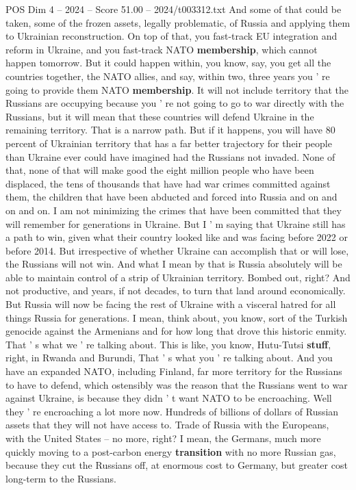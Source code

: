 \begin{textsample}{POS Dim 4 – 2024 – Score 51.00 – 2024/t003312.txt}
And some of that could be taken, some of the frozen assets, legally problematic, of Russia and applying them to Ukrainian reconstruction.
On top of that, you fast-track EU integration and reform in Ukraine, and you fast-track NATO \textbf{membership}, which cannot happen tomorrow.
But it could happen within, you know, say, you get all the countries together, the NATO allies, and say, within two, three years you ' re going to provide them NATO \textbf{membership}.
It will not include territory that the Russians are occupying because you ' re not going to go to war directly with the Russians, but it will mean that these countries will defend Ukraine in the remaining territory.
That is a narrow path.
But if it happens, you will have 80 percent of Ukrainian territory that has a far better trajectory for their people than Ukraine ever could have imagined had the Russians not invaded.
None of that, none of that will make good the eight million people who have been displaced, the tens of thousands that have had war crimes committed against them, the children that have been abducted and forced into Russia and on and on and on.
I am not minimizing the crimes that have been committed that they will remember for generations in Ukraine.
But I ' m saying that Ukraine still has a path to win, given what their country looked like and was facing before 2022 or before 2014.
But irrespective of whether Ukraine can accomplish that or will lose, the Russians will not win.
And what I mean by that is Russia absolutely will be able to maintain control of a strip of Ukrainian territory.
Bombed out, right?
And not productive, and years, if not decades, to turn that land around economically.
But Russia will now be facing the rest of Ukraine with a visceral hatred for all things Russia for generations.
I mean, think about, you know, sort of the Turkish genocide against the Armenians and for how long that drove this historic enmity.
That ' s what we ' re talking about.
This is like, you know, Hutu-Tutsi \textbf{stuff}, right, in Rwanda and Burundi, That ' s what you ' re talking about.
And you have an expanded NATO, including Finland, far more territory for the Russians to have to defend, which ostensibly was the reason that the Russians went to war against Ukraine, is because they didn ' t want NATO to be encroaching.
Well they ' re encroaching a lot more now.
Hundreds of billions of dollars of Russian assets that they will not have access to.
Trade of Russia with the Europeans, with the United States -- no more, right?
I mean, the Germans, much more quickly moving to a post-carbon energy \textbf{transition} with no more Russian gas, because they cut the Russians off, at enormous cost to Germany, but greater cost long-term to the Russians.

\end{textsample}
